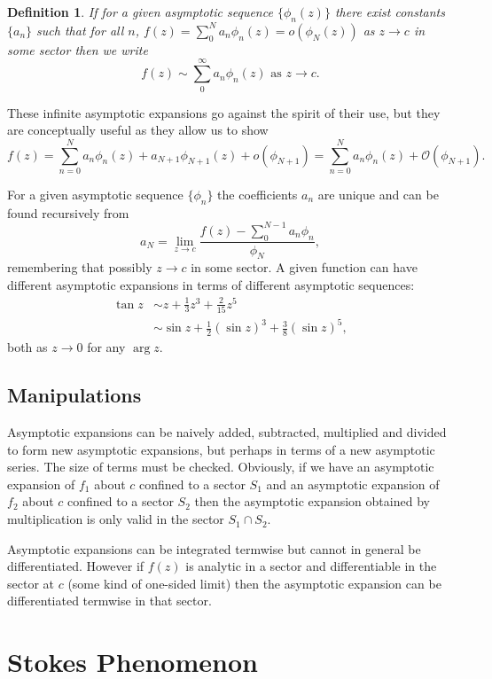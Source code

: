 \documentclass{notes}
\newcommand{\cO}{\mathcal{O}}
\theoremstyle{plain}
\newtheorem*{definition}{Definition}
\begin{document}
\begin{definition}
If for a given asymptotic sequence $\{\phi_n(z)\}$ there exist constants
$\{ a_n \}$ such that for all $n$, $f(z) = \sum_0^N a_n \phi_n(z)
= o(\phi_N(z))$ as $z \to c$ in some sector then we write
\[
f(z) \sim \sum_0^\infty a_n \phi_n(z) \text{ as } z \to c.
\]
\end{definition}

These infinite asymptotic expansions go against the spirit of their use,
but they are conceptually useful as they allow us to show
\[
f(z) = \sum_{n=0}^N a_n \phi_n(z) + a_{N+1} \phi_{N+1}(z) + o(\phi_{N+1})
= \sum_{n=0}^N a_n \phi_n(z) + \cO(\phi_{N+1}).
\]

For a given asymptotic sequence $\{\phi_n\}$ the coefficients
$a_n$ are unique and can be found recursively from
\[
a_N = \lim_{z \to c} \frac{f(z) - \sum_0^{N-1} a_n \phi_n}{\phi_N},
\]
remembering that possibly $z \to c$ in some sector.  A given function
can have different asymptotic expansions in terms of different
asymptotic sequences:
\begin{align*}
\tan z &\sim z + \tfrac{1}{3} z^3 + \tfrac{2}{15} z^5\\
& \sim \sin z + \tfrac{1}{2} \left(\sin z \right)^3
+ \tfrac{3}{8} \left( \sin z \right)^5,
\end{align*}
both as $z \to 0$ for any $\arg z$.

\subsection{Manipulations}

Asymptotic expansions can be naively added, subtracted, multiplied
and divided to form new asymptotic expansions, but perhaps in terms
of a new asymptotic series.  The size of terms must be checked.
Obviously, if we have an asymptotic expansion of $f_1$ about $c$ confined
to a sector $S_1$ and an asymptotic expansion of $f_2$ about $c$ confined
to a sector $S_2$ then the asymptotic expansion obtained by multiplication
is only valid in the sector $S_1 \cap S_2$.

Asymptotic expansions can be integrated termwise but cannot in general be
differentiated.  However if $f(z)$ is analytic in a sector and
differentiable in the sector at $c$ (some kind of one-sided limit) then
the asymptotic expansion can be differentiated termwise in that sector.

\section{Stokes Phenomenon}
\end{document}
